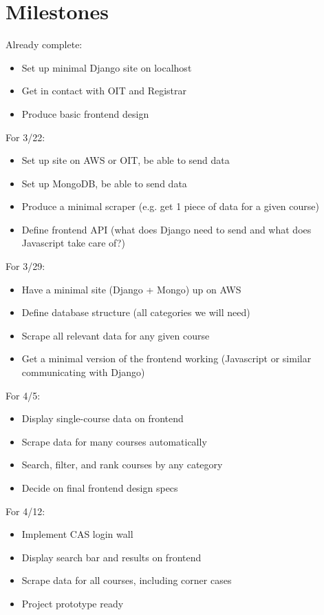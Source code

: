 \documentclass[11pt]{article}
\begin{document}
\section{Milestones}
\par Already complete:
\begin{itemize}
\item Set up minimal Django site on localhost
\item Get in contact with OIT and Registrar
\item Produce basic frontend design
\end{itemize}
\par For 3/22:
\begin{itemize}
\item Set up site on AWS or OIT, be able to send data
\item Set up MongoDB, be able to send data
\item Produce a minimal scraper (e.g. get 1 piece of data for a given course)
\item Define frontend API (what does Django need to send and what does Javascript take care of?)
\end{itemize}
\par For 3/29:
\begin{itemize}
\item Have a minimal site (Django + Mongo) up on AWS
\item Define database structure (all categories we will need)
\item Scrape all relevant data for any given course
\item Get a minimal version of the frontend working (Javascript or similar communicating with Django)
\end{itemize}
\par For 4/5:
\begin{itemize}
\item Display single-course data on frontend
\item Scrape data for many courses automatically
\item Search, filter, and rank courses by any category
\item Decide on final frontend design specs
\end{itemize}
\par For 4/12:
\begin{itemize}
\item Implement CAS login wall
\item Display search bar and results on frontend
\item Scrape data for all courses, including corner cases
\item Project prototype ready
\end{itemize}
\end{document}
